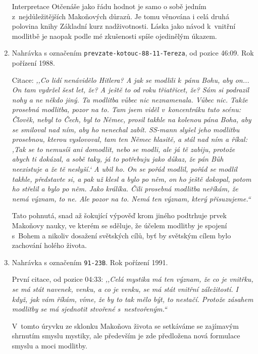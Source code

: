 \begin{enumerate}
{    Interpretace Otčenáše jako řádu hodnot je samo o sobě jedním
    z~nejdůležitějších Makoňových důrazů. Je tomu věnována i celá druhá polovina
    knihy Základní kurz nadživotnosti\cite{KaMaZKN}. Láska jako návod k~vnitřní
    modlitbě je naopak podle mé zkušenosti spíše ojedinělým úkazem.
  }
  \item{
    Nahrávka s označením \texttt{prevzate-kotouc-88-11-Tereza}, od pozice 46:09.
    Rok pořízení 1988.

    Citace: \textit{%
      ,,Co lidí nenávidělo Hitlera? A jak se modlili k~pánu Bohu, aby on... On tam
      vydržel šest let, že? A ještě to od roku třiatřicet, že? Sám si podrazil
      nohy a ne někdo jiný. Ta modlitba vůbec nic neznamenala. Vůbec nic. Takže
      prosebná modlitba, pozor na to. Tam jsem viděl v~koncentráku tuto scénu:
      Člověk, nebyl to Čech, byl to Němec, prosil takhle na kolenou pána Boha,
      aby se smiloval nad ním, aby ho nenechal zabít. SS-mann slyšel jeho
      modlitbu prosebnou, kterou vyslovoval, tam ten Němec hlasitě, a stál nad
      ním a říkal: ,Tak se to nemusíš ani domodlit, nebo se modli, ale já tě
      zabiju, protože abych ti dokázal, a sobě taky, já to potřebuju jako důkaz,
      že pán Bůh neexistuje a že tě neslyší.` A ubil ho. On se pořád modlil,
      pořád se modlil takhle, představte si, a pak už klesl a bylo po něm, on ho
      ještě dokopal, potom ho střelil a bylo po něm. Jako králíka. Čili prosebná
      modlitba neříkám, že nemá význam, to ne. Ale pozor na to. Nemá ten význam,
      který přisuzujeme.``
    }

    Tato pohnutá, snad až šokující výpověď krom jiného podtrhuje prvek
    Makoňovy nauky, ve kterém se sděluje, že účelem modlitby je spojení s~Bohem
    a nikoliv dosažení světských cílů, byť by světským cílem bylo zachování
    holého života.
  }
  \item{
    Nahrávka s označením \texttt{91-23B}.
    Rok pořízení 1991.

    První citace, od pozice 04:33: \textit{%
      ,,Celá mystika má ten význam, že co je vnitřku, se má stát navenek, venku, a
      co je venku, se má stát vnitřní záležitostí. I když, jak vám říkám, víme,
      že by to tak mělo být, to nestačí. Protože zásahem modlitby se má
      sjednotit stvořené s~nestvořeným.``
    }

    V~tomto úryvku ze sklonku Makoňova života se setkáváme se zajímavým shrnutím
    smyslu mystiky, ale především je zde předložena nová formulace smyslu a moci
    modlitby.

}
\end{enumerate}
